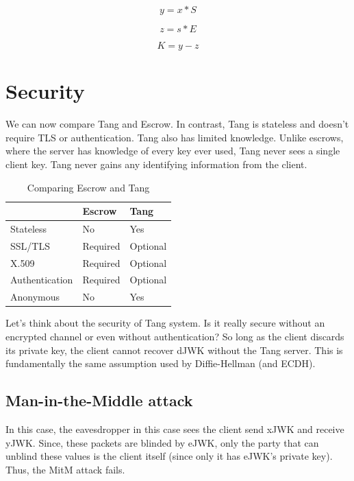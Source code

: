 \begin{equation}
    y = x * S
\end{equation}

\begin{equation}
    z = s * E
\end{equation}

\begin{equation}
    K = y - z
\end{equation}

\section{Security}

We can now compare Tang and Escrow. In contrast, Tang is stateless and doesn't require TLS or authentication.
Tang also has limited knowledge. Unlike escrows, where the server has knowledge of every key ever used, Tang never sees a single client key.
Tang never gains any identifying information from the client.

\begin{table}[h]
\centering
\label{compare}
\begin{tabular}{@{}lll@{}}
\toprule
               & Escrow   & Tang                         \\ \midrule
Stateless      & No       & Yes                          \\
SSL/TLS        & Required & Optional                     \\
X.509          & Required & Optional                     \\
Authentication & Required & Optional                     \\
Anonymous      & No       & Yes                          \\ \bottomrule
\end{tabular}
\caption{Comparing Escrow and Tang}
\end{table}

Let's think about the security of Tang system. Is it really secure without an encrypted channel or even without authentication?
So long as the client discards its private key, the client cannot recover dJWK without the Tang server.
This is fundamentally the same assumption used by Diffie-Hellman (and ECDH).

\subsection{Man-in-the-Middle attack}
In this case, the eavesdropper in this case sees the client send xJWK and receive yJWK.
Since, these packets are blinded by eJWK, only the party that can unblind these values is the client itself (since only it has eJWK's private key).
Thus, the MitM attack fails.
